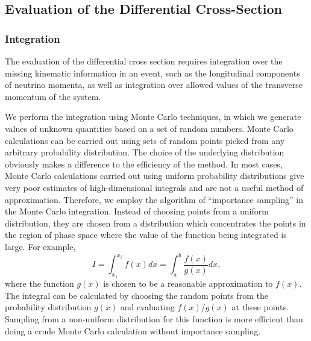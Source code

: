 \subsection{Evaluation of the Differential Cross-Section}

\subsubsection{Integration}
The evaluation of the differential cross section requires integration over the missing kinematic information in an event, such 
as the longitudinal components of neutrino momenta, as well as integration over allowed values of the transverse momentum
of the system.

We perform the integration using Monte Carlo techniques, in which we generate values of unknown quantities based on a set of
random numbers.  Monte Carlo calculations can be carried out using sets of random points picked from any arbitrary probability 
distribution. The choice of the underlying distribution obviously makes a difference to the efficiency of the method. In most cases,
Monte Carlo calculations carried out using uniform probability distributions give very poor estimates of high-dimensional integrals
and are not a useful method of approximation. 
Therefore, we employ the algorithm of ``importance sampling'' in the Monte Carlo integration. Instead of choosing points from a 
uniform distribution, they are chosen from a distribution which concentrates the points in the region of phase space where the 
value of the function being integrated is large.  For example,
\begin{equation}
\label{eqn:ImpSampling}
I=\int_{x_{1}}^{x_{2}} f(x)dx = \int_{a}^{b} \frac{f(x)}{g(x)}dx,
\end{equation}
where the function $g(x)$ is chosen to be a reasonable approximation to $f(x)$. The integral can be calculated by choosing the random points 
from the probability distribution $g(x)$ and evaluating $f(x)/g(x)$ at these points.  Sampling from a non-uniform distribution for this function 
is more efficient than doing a crude Monte Carlo calculation without importance sampling.

